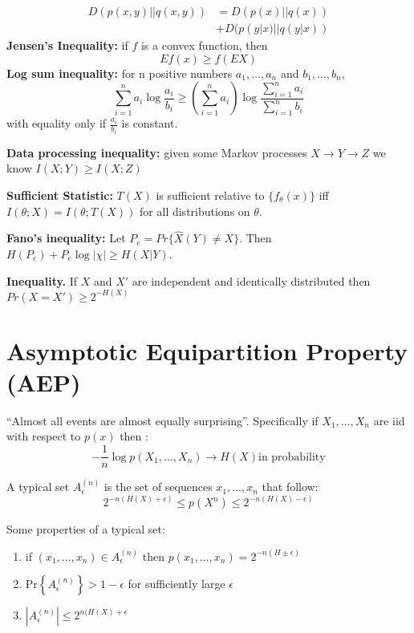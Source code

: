 \documentclass[10pt]{article}
\begin{document}
\begin{tiny}
\begin{multicols}{3}
\begin{align}
D(p(x,y)||q(x,y))&=D(p(x)||q(x))\\
&+D(p(y|x)||q(y|x))
\end{align}
{\bf Jensen's Inequality:} if $f$ is a convex function, then
\begin{equation}
Ef(x) \geq f(EX)
\end{equation}
{\bf Log sum inequality:} for n positive numbers $a_1,\ldots,a_n$ and $b_1,\ldots,b_n$,
\begin{equation}
\sum_{i=1}^n a_i \log \frac{a_i}{b_i} \geq \left( \sum_{i=1}^n a_i \right) \log \frac{\sum_{i=1}^n a_i}{\sum_{i=1}^n b_i}
\end{equation}
with equality only if $\frac{a_i}{b_i}$ is constant. 

{\bf Data processing inequality:} given some Markov processes $X\rightarrow Y\rightarrow Z$ we know $I(X;Y)\geq I(X;Z)$

{\bf Sufficient Statistic:} $T(X)$ is sufficient relative to $\{f_\theta (x)\}$ iff $I(\theta;X)=I(\theta;T(X))$ for all distributions on $\theta$.

{\bf Fano's inequality:} Let $P_e=Pr\{\hat{X}(Y)\neq X\}$. Then $H(P_e)+P_e \log |\chi| \geq H(X|Y)$.

{\bf Inequality.} If $X$ and $X'$ are independent and identically distributed then $Pr(X=X') \geq 2^{-H(X)}$


\section*{Asymptotic Equipartition Property (AEP)}
``Almost all events are almost equally surprising''. Specifically if $X_1,\ldots,X_n$ are iid with respect to $p(x)$ then :
\begin{equation}
-\frac{1}{n}\log p(X_1,\ldots,X_n)\rightarrow H(X) \text{in probability}
\end{equation}

A typical set $A_\epsilon^{(n)}$ is the set of sequences $x_1,\ldots, x_n$ that follow:
\begin{equation}
2^{-n(H(X)+\epsilon)}\leq p(X^n)\leq 2^{-n(H(X)-\epsilon)}
\end{equation}

Some properties of a typical set:
\begin{enumerate}
\item if $(x_1,\ldots,x_n) \in A_\epsilon^{(n)}$ then $p(x_1,\ldots,x_n) = 2^{-n(H\pm \epsilon)}$
\item Pr$\left\{A_\epsilon^{(n)}\right\}>1-\epsilon$ for sufficiently large $\epsilon$
\item $|A_\epsilon^{(n)}| \leq 2^{n(H(X)+\epsilon}$
\end{enumerate}


\end{multicols}
\end{tiny}
\end{document}
